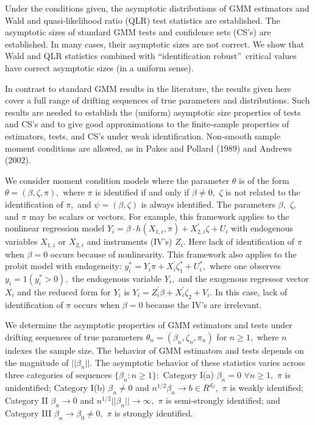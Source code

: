 \documentclass[12pt,titlepage,final,oneside,letterpaper]{article}
\begin{document}
Under the conditions given, the asymptotic distributions of GMM estimators
and Wald and quasi-likelihood ratio (QLR) test statistics are established.
The asymptotic sizes of standard GMM tests and confidence sets (CS's) are
established. In many cases, their asymptotic sizes are not correct. We show
that Wald and QLR statistics combined with \textquotedblleft identification
robust\textquotedblright\ critical values have correct asymptotic sizes (in
a uniform sense).

In contrast to standard GMM results in the literature, the results given
here cover a full range of drifting sequences of true parameters and
distributions. Such results are needed to establish the (uniform) asymptotic
size properties of tests and CS's and to give good approximations to the
finite-sample properties of estimators, tests, and CS's under weak
identification. Non-smooth sample moment conditions are allowed, as in Pakes
and Pollard (1989) and Andrews (2002).

We consider moment condition models where the parameter $\theta $ is of the
form $\theta =(\beta ,\zeta ,\pi ),$ where $\pi $ is identified if and only
if $\beta \neq 0,$ $\zeta $ is not related to the identification of $\pi ,$
and $\psi =(\beta ,\zeta )$ is always identified. The parameters $\beta ,$ $%
\zeta ,$ and $\pi $ may be scalars or vectors. For example, this framework
applies to the nonlinear regression model $Y_{i}=\beta \cdot h\left(
X_{1,i},\pi \right) +X_{2,i}^{\prime }\zeta +U_{i}$ with endogenous
variables $X_{1,i}$ or $X_{2,i}$ and instruments (IV's) $Z_{i}.$ Here lack
of identification of $\pi $ when $\beta =0$ occurs because of nonlinearity.
This framework also applies to the probit model with endogeneity: $%
y_{i}^{\ast }=Y_{i}\pi +X_{i}^{\prime }\zeta _{1}^{\ast }+U_{i}^{\ast },$
where one observes $y_{i}=1(y_{i}^{\ast }>0),$ the endogenous variable $%
Y_{i},$ and the exogenous regressor vector $X_{i}$ and the reduced form for $%
Y_{i}$ is $Y_{i}=Z_{i}^{\prime }\beta +X_{i}^{\prime }\zeta _{2}+V_{i}.$ In
this case, lack of identification of $\pi $ occurs when $\beta =0$ because
the IV's are irrelevant.

We determine the asymptotic properties of GMM estimators and tests under
drifting sequences of true parameters $\theta _{n}=(\beta _{n},\zeta
_{n},\pi _{n})$ for $n\geq 1,$ where $n$ indexes the sample size. The
behavior of GMM estimators and tests depends on the magnitude of $||\beta
_{n}||.$ The asymptotic behavior of these statistics varies across three
categories of sequences $\{\beta _{n}:n\geq 1\}:$ Category I(a) $\beta
_{n}=0 $ $\forall n\geq 1,$ $\pi $ is unidentified; Category I(b) $\beta
_{n}\neq 0$ and $n^{1/2}\beta _{n}\rightarrow b\in R^{d_{\beta }},$ $\pi $
is weakly identified; Category II $\beta _{n}\rightarrow 0$ and $%
n^{1/2}||\beta _{n}||\rightarrow \infty ,$ $\pi $ is semi-strongly
identified; and Category III $\beta _{n}\rightarrow \beta _{0}\neq 0,$ $\pi $
is strongly identified.
\end{document}
